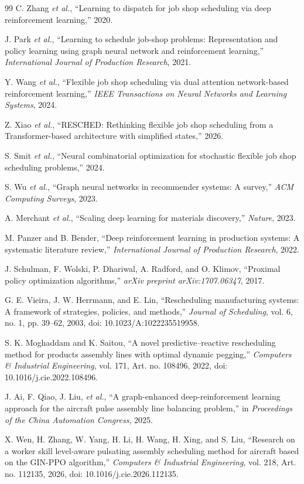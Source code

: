 \begin{thebibliography}{99}
C. Zhang \emph{et al.}, ``Learning to dispatch for job shop scheduling via deep reinforcement learning,'' 2020.

J. Park \emph{et al.}, ``Learning to schedule job-shop problems: Representation and policy learning using graph neural network and reinforcement learning,'' \emph{International Journal of Production Research}, 2021.

Y. Wang \emph{et al.}, ``Flexible job shop scheduling via dual attention network-based reinforcement learning,'' \emph{IEEE Transactions on Neural Networks and Learning Systems}, 2024.

Z. Xiao \emph{et al.}, ``RESCHED: Rethinking flexible job shop scheduling from a Transformer-based architecture with simplified states,'' 2026.

S. Smit \emph{et al.}, ``Neural combinatorial optimization for stochastic flexible job shop scheduling problems,'' 2024.

S. Wu \emph{et al.}, ``Graph neural networks in recommender systems: A survey,'' \emph{ACM Computing Surveys}, 2023.

A. Merchant \emph{et al.}, ``Scaling deep learning for materials discovery,'' \emph{Nature}, 2023.

M. Panzer and B. Bender, ``Deep reinforcement learning in production systems: A systematic literature review,'' \emph{International Journal of Production Research}, 2022.

J. Schulman, F. Wolski, P. Dhariwal, A. Radford, and O. Klimov, ``Proximal policy optimization algorithms,'' \emph{arXiv preprint arXiv:1707.06347}, 2017.

G. E. Vieira, J. W. Herrmann, and E. Lin, ``Rescheduling manufacturing systems: A framework of strategies, policies, and methods,'' \emph{Journal of Scheduling}, vol. 6, no. 1, pp. 39--62, 2003, doi: 10.1023/A:1022235519958.

S. K. Moghaddam and K. Saitou, ``A novel predictive--reactive rescheduling method for products assembly lines with optimal dynamic pegging,'' \emph{Computers \& Industrial Engineering}, vol. 171, Art. no. 108496, 2022, doi: 10.1016/j.cie.2022.108496.

J. Ai, F. Qiao, J. Liu, \emph{et al.}, ``A graph-enhanced deep-reinforcement learning approach for the aircraft pulse assembly line balancing problem,'' in \emph{Proceedings of the China Automation Congress}, 2025.

X. Wen, H. Zhang, W. Yang, H. Li, H. Wang, H. Xing, and S. Liu,
``Research on a worker skill level-aware pulsating assembly scheduling method for aircraft based on the GIN-PPO algorithm,''
\emph{Computers \& Industrial Engineering}, vol. 218, Art. no. 112135, 2026,
doi: 10.1016/j.cie.2026.112135.
\end{thebibliography}
